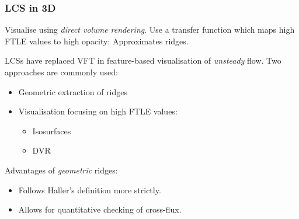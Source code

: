 \subsubsection{LCS in 3D} 
Visualise using \emph{direct volume rendering}. Use a transfer function which maps high FTLE values to high opacity: Approximates ridges.

LCSs have replaced VFT in feature-based visualisation of \emph{unsteady} flow. Two approaches are commonly used:
\begin{itemize}
    \item Geometric extraction of ridges
    \item Visualisation focusing on high FTLE values:
        \begin{itemize}
            \item Isosurfaces
            \item DVR
        \end{itemize}
\end{itemize}
Advantages of \emph{geometric} ridges:
\begin{itemize}
    \item Follows Haller's definition more strictly.
    \item Allows for quantitative checking of cross-flux.
\end{itemize}

